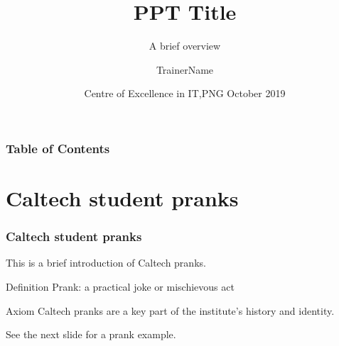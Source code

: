\documentclass[hyperref={bookmarks=false},aspectratio=169]{beamer}
\title[PPT Title]
{\bfseries{PPT Title}}
\subtitle{A brief overview}
\author[TrainerName] %
{TrainerName\inst{1} } %
\institute[CEIT]
{
  \inst{1}
  Trainer\\
  Centre of Excellence in IT,PNG
}
\date[CEIT, 2014]
{Centre of Excellence in IT,PNG October 2019}
\begin{document}
\frame{\titlepage}  %

\begin{frame}
\frametitle{Table of Contents}
\tableofcontents
\end{frame}






%
%

\section{Caltech student pranks}

\begin{frame}
\frametitle{Caltech student pranks}

This is a brief introduction of \alert{Caltech pranks}.

\begin{block}{Definition}
Prank: a practical joke or mischievous act
\end{block}

\begin{alertblock}{Axiom}
Caltech pranks are a key part of the institute's history and identity.
\end{alertblock}

\begin{examples}
See the next slide for a prank example.
\end{examples}
\end{frame}
\end{document}
